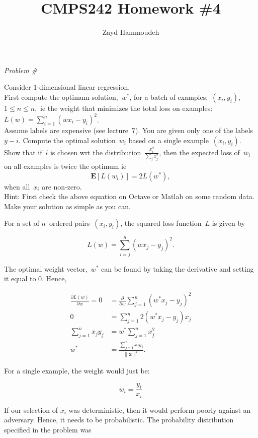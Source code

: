 \documentclass{report}
\title{\textbf{CMPS242 Homework \#4}}
\author{Zayd Hammoudeh}
\newcounter{problemCount}
\newenvironment{problemshell}{
  \par%
  \medskip
  \leftskip=0pt\rightskip=0pt%
}
{
  \par\medskip
}
\newenvironment{problem}
{%
  \stepcounter{problemCount}
  \begin{problemshell}
    \noindent \textit{Problem \#\arabic{problemCount}} \\
    \bfseries  
}
{
  \end{problemshell}
}
\newcommand{\problemspace}{\\[0.4em]}
\newcommand{\norm}[1]{\lVert\mathbf{#1}\rVert^{2}}
\begin{document}
  \maketitle
  
  \begin{problem}
    Consider $1$-dimensional linear regression.
    \problemspace
    First compute the optimum solution,~$w^{*}$, for a batch of examples,~${(x_i,y_i)}$, ${1 \leq n \leq n}$,~ie the weight that minimizes the total loss on examples:~${L(w)=\sum_{i=1}^n(wx_{i}-y_{i})^2}$.
    \problemspace
    Assume labels are expensive (see lecture~7).  You are given only one of the labels~$y-i$.  Compute the optimal solution~$w_i$ based on a single example~$(x_i,y_i)$.
    \problemspace
    Show that if~$i$ is chosen wrt the distribution~$\frac{x_{i}^{2}}{\sum_{j}x_{j}^{2}}$, then the expected loss of~$w_{i}$ on all examples is twice the optimum ie
    \[\mathbf{E}[L(w_i)] = 2L(w^{*}), \]
    \noindent
    when all~$x_i$ are non-zero.
    \problemspace
    Hint: First check the above equation on Octave or Matlab on some random data.  Make your solution as simple as you can.
  \end{problem}
  
  For a set of $n$~ordered pairs~$(x_i,y_i)$, the squared loss function~$L$ is given by
  
  \begin{equation}
    L(w)=\sum_{i=j}^n (w x_{j}-y_{j})^2\textrm{.}
  \end{equation}

  The optimal weight vector,~$w^{*}$ can be found by taking the derivative and setting it equal to 0.  Hence,
  
  \begin{align}
    \frac{\partial L(w)}{\partial w}=0&=\frac{\partial}{\partial w}\sum_{j=1}^n (w^{*} x_{j}-y_{j})^2\\
    0&=\sum_{j=1}^{n} 2(w^{*} x_{j}-y_{j})x_{j}\\
    \sum_{j=1}^n x_{j}y_{j} &= w^{*} \sum_{j=1}^{n} x_{j}^2\\
    w^{*}&=\frac{\sum_{j=1}^{n}x_{j}y_{j}}{\norm{x}} \textrm{.}
  \end{align}
  
  For a single example, the weight would just be:
  
  \begin{equation}
    w_{i}=\frac{y_{i}}{x_{i}}
  \end{equation}
  
  If our selection of $x_i$ was deterministic, then it would perform poorly against an adversary. Hence, it needs to be probabilistic.  The probability distribution specified in the problem was
  
\end{document}
